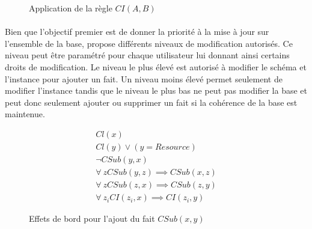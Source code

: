 \begin{figure}
    \centering
    \begin{subfigure}[b]{.45\textwidth}
        \centering
    \end{subfigure}
    \raisebox{1.5cm}{\scalebox{1.5}{$\longrightarrow$}}
    \begin{subfigure}[b]{.45\textwidth}
        \centering
    \end{subfigure}
    \caption{Application de la règle $CI(A,B)$}
    \label{fig:rule_ci}
\end{figure}

\paragraph{}
Bien que l'objectif premier est de donner la priorité à la mise à jour sur l'ensemble de la base, \cite{chabinUsingGraphGrammar2019} propose différents niveaux de modification autorisés.
Ce niveau peut être paramétré pour chaque utilisateur lui donnant ainsi certains droits de modification.
Le niveau le plus élevé est autorisé à modifier le schéma et l'instance pour ajouter un fait.
Un niveau moins élevé permet seulement de modifier l'instance tandis que le niveau le plus bas ne peut pas modifier la base et peut donc seulement ajouter ou supprimer un fait si la cohérence de la base est maintenue.

\begin{figure}
    \begin{eqnarray}
        Cl(x)\\
        Cl(y) \lor (y = Resource)\\
        \neg CSub(y, x)\\
        \forall~z CSub(y, z) \implies CSub(x, z)\\
        \forall~z CSub(z, x) \implies CSub(z, y)\\
        \forall~z_i CI(z_i, x) \implies CI(z_i, y) \label{eq:rule_csub:ci}
    \end{eqnarray}
    \caption{Effets de bord pour l'ajout du fait $CSub(x, y)$}
    \label{eq:rule_csub}
\end{figure}

